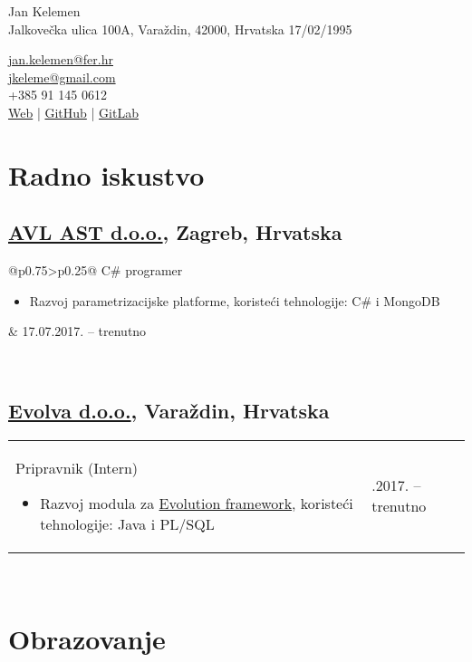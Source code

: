 \documentclass[a4paper]{article}
\makeatletter
\newlength{\tablewidth}
\newenvironment{period}[2]{%
\newcommand{\sarma}{#2}%
\setlength{\tablewidth}{\linewidth}
\addtolength{\tablewidth}{-2\tabcolsep}
\begin{tabular}{@{}p{0.75\tablewidth}>{\raggedleft\arraybackslash}p{0.25\tablewidth}@{}}%
#1 \newline
\begin{itemize}
}{%
\end{itemize} & \sarma \\%
\end{tabular}\\
}
\makeatother
\begin{document}
\fontfamily{\sfdefault}
\selectfont

\begin{minipage}{.5\textwidth}
\LARGE{Jan Kelemen}\\
\normalsize{Jalkove\v{c}ka ulica 100A, Vara\v{z}din, 42000, Hrvatska}
\normalsize{17/02/1995}
\end{minipage}%
\begin{minipage}{.5\textwidth}
\raggedleft
\href{mailto:jan.kelemen@fer.hr}{jan.kelemen@fer.hr} \\
\href{mailto:jkeleme@gmail.com}{jkeleme@gmail.com} \\
+385 91 145 0612 \\
\href{http://jan-kelemen.github.io/}{Web} | \href{https://github.com/jan-kelemen}{GitHub} | \href{https://gitlab.com/jan-kelemen}{GitLab}
\end{minipage}

\vspace{1em}

\section{Radno iskustvo}
\subsection{\href{https://www.avl.com/}{AVL AST d.o.o.}, Zagreb, Hrvatska}
\begin{period}{C\# programer}{17.07.2017. -- trenutno}
	\item
		Razvoj parametrizacijske platforme, koriste\'{c}i tehnologije: C\# i MongoDB
\end{period}
\subsection{\href{http://www.evolva.hr/hr/index.html}{Evolva d.o.o.}, Vara\v{z}din, Hrvatska}
\begin{period}{Pripravnik (Intern)}{22.08.2016. -- 23.09.2016.}
	\item
		Razvoj modula za \href{http://www.evolution-framework.com/}{Evolution framework}, koriste\'{c}i tehnologije: Java i PL/SQL
\end{period}

\section{Obrazovanje}
\end{document}
